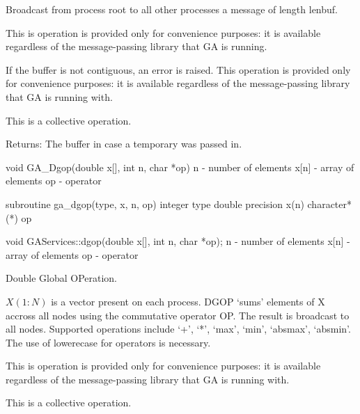 \documentclass[12pt]{article}
\begin{document}
\begin{desc}

Broadcast from process root to all other processes a message of length lenbuf.

This is operation is provided only for convenience purposes: it is available 
regardless of the message-passing library that GA is running.

If the buffer is not contiguous, an error is raised. This operation is provided 
only for convenience purposes: it is available regardless of the message-passing 
library that GA is running with.


This is a collective operation.

Returns: 
The buffer in case a temporary was passed in. 
\end{desc}


\begin{capi}
void GA_Dgop(double x[], int n, char *op)
   n          - number of elements                                         \access{[input]} 
   x[n]       - array of elements                                    
   op         - operator                                                   \access{[input]} 
\end{capi}

\begin{fapi}
subroutine ga_dgop(type, x, n, op)
   integer type                                                            \access{[input]} 
   double precision x(n)                                             
   character*(*) op                                                        \access{[input]} 
\end{fapi}

\begin{cxxapi}
void GAServices::dgop(double x[], int n, char *op);
   n          - number of elements                                         \access{[input]}
   x[n]       - array of elements                                   
   op         - operator                                                   \access{[input]}
\end{cxxapi}



\begin{desc}

Double Global OPeration.

$X(1:N)$ is a vector present on each process. DGOP `sums' elements of 
X accross all nodes using the commutative operator OP. The result is 
broadcast to all nodes. Supported operations include `+', `*', `max', 
`min', `absmax', `absmin'. The use of lowerecase for operators is necessary.

This is operation is provided only for convenience purposes: it is available 
regardless of the message-passing library that GA is running with.

This is a collective operation.
\end{desc}
\end{document}
